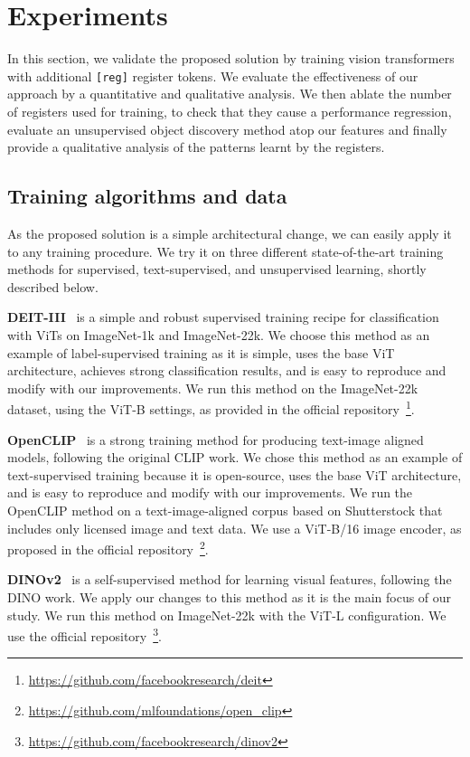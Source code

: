 \section{Experiments}
In this section, we validate the proposed solution by training vision transformers with additional \texttt{[reg]} register tokens.
We evaluate the effectiveness of our approach by a quantitative and qualitative analysis.
We then ablate the number of registers used for training, to check that they  cause a performance regression, evaluate an unsupervised object discovery method atop our features and finally provide a qualitative analysis of the patterns learnt by the registers.


\subsection{Training algorithms and data}
\label{sec:algos}
As the proposed solution is a simple architectural change, we can easily apply it to any training procedure. 
We try it on three different state-of-the-art training methods for supervised, text-supervised, and unsupervised learning, shortly described below.

\textbf{DEIT-III}~\citep{touvron2022deit} is a simple and robust supervised training recipe for classification with ViTs on ImageNet-1k and ImageNet-22k.
We choose this method as an example of label-supervised training as it is simple, uses the base ViT architecture, achieves strong classification results, and is easy to reproduce and modify with our improvements. 
We run this method on the ImageNet-22k dataset, using the ViT-B settings, as provided in the official repository~\footnote{\url{https://github.com/facebookresearch/deit}}.

\textbf{OpenCLIP}~\citep{ilharco_gabriel_2021_5143773} is a strong training method for producing text-image aligned models, following the original CLIP work. 
We chose this method as an example of text-supervised training because it is open-source, uses the base ViT architecture, and is easy to reproduce and modify with our improvements. 
We run the OpenCLIP method on a text-image-aligned corpus based on Shutterstock that includes only licensed image and text data. 
We use a ViT-B/16 image encoder, as proposed in the official repository~\footnote{\url{https://github.com/mlfoundations/open_clip}}.

\textbf{DINOv2}~\citep{oquab2023dinov2} is a self-supervised method for learning visual features, following the DINO work.
We apply our changes to this method as it is the main focus of our study. 
We run this method on ImageNet-22k with the ViT-L configuration.
We use the official repository~\footnote{\url{https://github.com/facebookresearch/dinov2}}.



